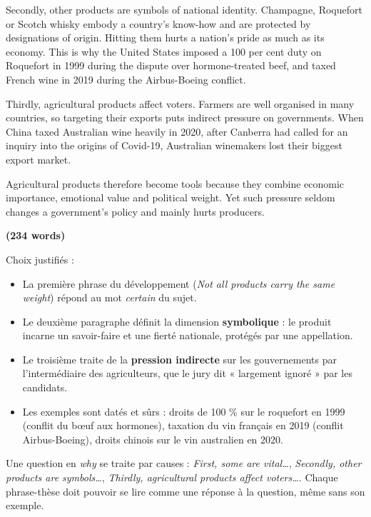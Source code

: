 \documentclass[11pt,a4paper]{article}
\providecommand{\tightlist}{\setlength{\itemsep}{0pt}\setlength{\parskip}{0pt}}
\begin{document}
Secondly, other products are symbols of national identity. Champagne, Roquefort or Scotch whisky embody a country's know-how and are protected by designations of origin. Hitting them hurts a nation's pride as much as its economy. This is why the United States imposed a 100 per cent duty on Roquefort in 1999 during the dispute over hormone-treated beef, and taxed French wine in 2019 during the Airbus-Boeing conflict.

Thirdly, agricultural products affect voters. Farmers are well organised in many countries, so targeting their exports puts indirect pressure on governments. When China taxed Australian wine heavily in 2020, after Canberra had called for an inquiry into the origins of Covid-19, Australian winemakers lost their biggest export market.

Agricultural products therefore become tools because they combine economic importance, emotional value and political weight. Yet such pressure seldom changes a government's policy and mainly hurts producers.

\textbf{(234 words)}

Choix justifiés :

\begin{itemize}
\tightlist
\item
  La première phrase du développement (\emph{Not all products carry the same weight}) répond au mot \emph{certain} du sujet.
\item
  Le deuxième paragraphe définit la dimension \textbf{symbolique} : le produit incarne un savoir-faire et une fierté nationale, protégés par une appellation.
\item
  Le troisième traite de la \textbf{pression indirecte} sur les gouvernements par l'intermédiaire des agriculteurs, que le jury dit « largement ignoré » par les candidats.
\item
  Les exemples sont datés et sûrs : droits de 100 \% sur le roquefort en 1999 (conflit du bœuf aux hormones), taxation du vin français en 2019 (conflit Airbus-Boeing), droits chinois sur le vin australien en 2020.
\end{itemize}

\begin{methode}

Une question en \emph{why} se traite par causes : \emph{First, some are vital\ldots{}}, \emph{Secondly, other products are symbols\ldots{}}, \emph{Thirdly, agricultural products affect voters\ldots{}}. Chaque phrase-thèse doit pouvoir se lire comme une réponse à la question, même sans son exemple.

\end{methode}
\end{document}
